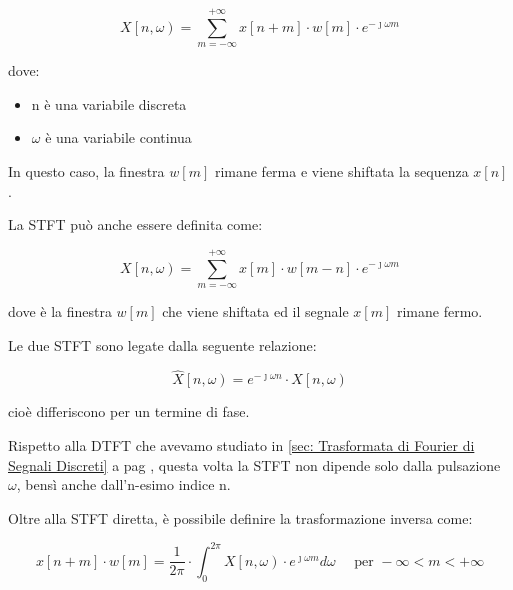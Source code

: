 {
    \Large 
    \begin{equation}
        X \left[ n, \omega\right) = \sum_{m = - \infty}^{+ \infty} x \left[ n + m\right] \cdot w \left[ m\right] \cdot e^{- \jmath \omega m}
    \end{equation}
}

dove: 

\begin{itemize}
    \item n è una variabile discreta 
    \item $\omega$ è una variabile continua 
\end{itemize}

In questo caso, la finestra $w \left[ m\right]$ rimane ferma e viene shiftata la sequenza $x \left[ n\right]$. \newline 

La STFT può anche essere definita come: 

{
    \Large 
    \begin{equation}
        X \left[ n, \omega\right) = \sum_{m = - \infty}^{+ \infty} x \left[ m\right] \cdot w \left[ m - n\right] \cdot e^{- \jmath \omega m}
    \end{equation}
}

dove è la finestra $w \left[ m\right]$ che viene shiftata ed il segnale $x \left[ m\right]$ rimane fermo. \newline 

Le due STFT sono legate dalla seguente relazione: 

{
    \Large 
    \begin{equation}
        \hat{X} \left[ n, \omega\right) =  e^{- \jmath \omega n} \cdot X \left[ n, \omega\right) 
    \end{equation}
}

cioè differiscono per un termine di fase. \newline 

Rispetto alla DTFT che avevamo studiato in \ref{sec: Trasformata di Fourier di Segnali Discreti}  a pag \pageref{sec: Trasformata di Fourier di Segnali Discreti}, 
questa volta la STFT non dipende solo dalla pulsazione $\omega$, bensì anche dall'n-esimo indice n. \newline 

\newpage 

Oltre alla STFT diretta, è possibile definire la trasformazione inversa come: 

{
    \Large 
    \begin{equation}
        x \left[ n + m\right] \cdot w \left[ m\right] 
        = 
        \dfrac{1}{2 \pi}
        \cdot 
        \int_{0}^{2 \pi}
        X \left[n , \omega\right) 
        \cdot 
        e^{\jmath \omega m} 
        d \omega
        \quad 
        \text{ per }
        - \infty < m < + \infty
    \end{equation}
}


